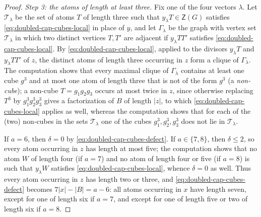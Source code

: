 \documentclass[a4paper, 10pt]{amsart}
\theoremstyle{plain}
\theoremstyle{definition}
\theoremstyle{definition}
\numberwithin{equation}{section}
\begin{document}
\begin{proof}
\smallskip
\noindent
\emph{Step 3: the atoms of length at least three.}  Fix one of the four
vectors $\lambda$.  Let $\mathcal T_{\lambda}$ be the set of atoms $T$ of
length three such that $y_{\lambda}T \in \mathsf Z (G)$ satisfies
\eqref{eq:doubled-cap-cubes-local} in place of $y$, and let $\Gamma_{\lambda}$ be the graph with vertex set
$\mathcal T_{\lambda}$ in which two distinct vertices $T, T'$ are adjacent if
$y_{\lambda}TT'$ satisfies \eqref{eq:doubled-cap-cubes-local}.  By
\eqref{eq:doubled-cap-cubes-local}, applied to the divisors $y_\lambda T$ and
$y_\lambda TT'$ of $z$, the distinct atoms of length three occurring in $z$ form a
clique of $\Gamma_{\lambda}$.  The computation shows that every maximal
clique of $\Gamma_\lambda$ contains at least one cube $g^3$ and at most one
atom of length three that is not of the form $g^3$ (a \emph{non-cube}); a
non-cube $T = g_1g_2g_3$ occurs at most twice in $z$,
since otherwise replacing $T^3$ by $g_1^3g_2^3g_3^3$ gives a factorization of $B$ of
length $|z|$, to which \eqref{eq:doubled-cap-cubes-local} applies as well, whereas the
computation shows that for each of the (two) non-cubes in the sets
$\mathcal T_\lambda$ one of the cubes $g_1^3, g_2^3, g_3^3$ does not lie in
$\mathcal T_\lambda$.

If $a = 6$, then $\delta = 0$ by \eqref{eq:doubled-cap-cubes-defect}.  If $a \in
\{7,8\}$, then $\delta \le 2$, so every atom occurring in $z$ has length at most five;
the computation shows that no atom $W$ of length four (if $a = 7$) and no
atom of length four or five (if $a = 8$) is such that $y_\lambda W$ satisfies
\eqref{eq:doubled-cap-cubes-local}, whence $\delta = 0$ as well.  Thus every atom occurring in
$z$ has length two or three, and \eqref{eq:doubled-cap-cubes-defect} becomes
$7|x|-|B| = a-6$: all atoms occurring in $x$ have length seven, except for one of
length six if $a = 7$, and except for one of length five or two of length six
if $a = 8$.


\end{proof}
\end{document}
